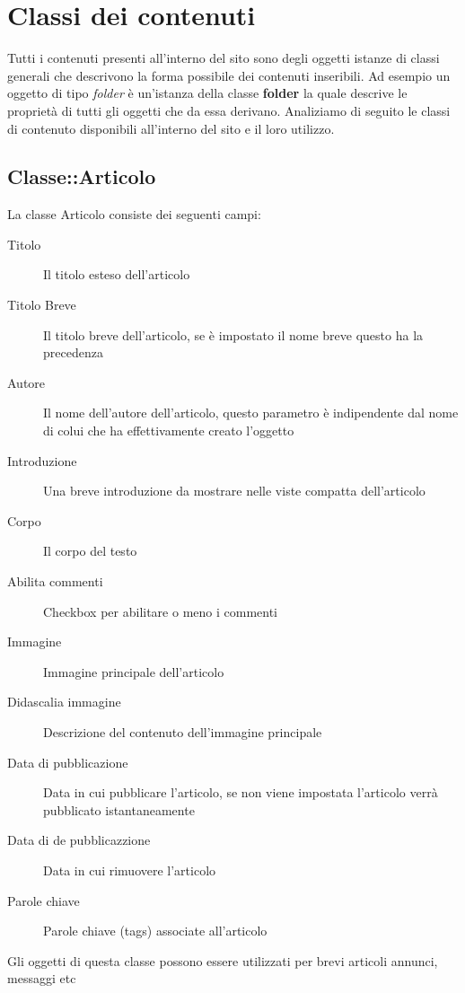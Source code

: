 \chapter[Classi]{Classi dei contenuti}

Tutti i contenuti presenti all'interno del sito sono degli oggetti istanze di classi generali che descrivono la forma possibile dei contenuti inseribili. Ad esempio un oggetto di tipo \textsl{folder} è un'istanza della classe \textbf{folder} la quale descrive le proprietà di tutti gli oggetti che da essa derivano. Analiziamo di seguito le classi di contenuto disponibili all'interno del sito e il loro utilizzo.

\section{Classe::Articolo}
La classe Articolo consiste dei seguenti campi:
\begin{description}
\item[Titolo] Il titolo esteso dell'articolo
\item[Titolo Breve] Il titolo breve dell'articolo, se è impostato il nome breve questo ha la precedenza
\item[Autore] Il nome dell'autore dell'articolo, questo parametro è indipendente dal nome di colui che ha effettivamente creato l'oggetto
\item[Introduzione]Una breve introduzione da mostrare nelle viste compatta dell'articolo
\item[Corpo] Il corpo del testo
\item[Abilita commenti] Checkbox per abilitare o meno i commenti
\item[Immagine] Immagine principale dell'articolo
\item[Didascalia immagine] Descrizione del contenuto dell'immagine principale
\item[Data di pubblicazione] Data in cui pubblicare l'articolo, se non viene impostata l'articolo verrà pubblicato istantaneamente
\item[Data di de pubblicazzione] Data in cui rimuovere l'articolo
\item[Parole chiave] Parole chiave (tags) associate all'articolo
\end{description}
Gli oggetti di questa classe possono essere utilizzati per brevi articoli annunci, messaggi etc

